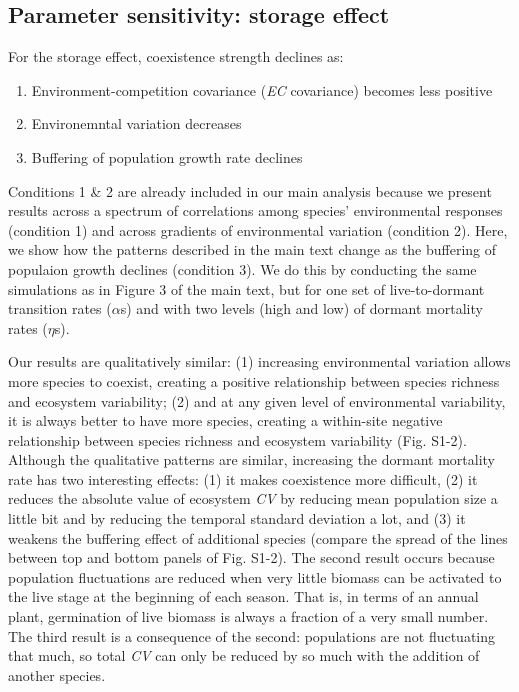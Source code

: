 \documentclass[11pt,]{article}
\providecommand{\tightlist}{%
  \setlength{\itemsep}{0pt}\setlength{\parskip}{0pt}}
\begin{document}
\subsection{Parameter sensitivity: storage effect}

For the storage effect, coexistence strength declines as:

\begin{enumerate}
\def\labelenumi{\arabic{enumi}.}
\tightlist
\item
  Environment-competition covariance (\emph{EC} covariance) becomes less
  positive
\item
  Environemntal variation decreases
\item
  Buffering of population growth rate declines
\end{enumerate}

Conditions 1 \& 2 are already included in our main analysis because we
present results across a spectrum of correlations among species'
environmental responses (condition 1) and across gradients of
environmental variation (condition 2). Here, we show how the patterns
described in the main text change as the buffering of populaion growth
declines (condition 3). We do this by conducting the same simulations as
in Figure 3 of the main text, but for one set of live-to-dormant
transition rates (\(\alpha\)s) and with two levels (high and low) of
dormant mortality rates (\(\eta\)s).

Our results are qualitatively similar: (1) increasing environmental
variation allows more species to coexist, creating a positive
relationship between species richness and ecosystem variability; (2) and
at any given level of environmental variability, it is always better to
have more species, creating a within-site negative relationship between
species richness and ecosystem variability (Fig. S1-2). Although the
qualitative patterns are similar, increasing the dormant mortality rate
has two interesting effects: (1) it makes coexistence more difficult,
(2) it reduces the absolute value of ecosystem \emph{CV} by reducing
mean population size a little bit and by reducing the temporal standard
deviation a lot, and (3) it weakens the buffering effect of additional
species (compare the spread of the lines between top and bottom panels
of Fig. S1-2). The second result occurs because population fluctuations
are reduced when very little biomass can be activated to the live stage
at the beginning of each season. That is, in terms of an annual plant,
germination of live biomass is always a fraction of a very small number.
The third result is a consequence of the second: populations are not
fluctuating that much, so total \emph{CV} can only be reduced by so much
with the addition of another species.
\end{document}

